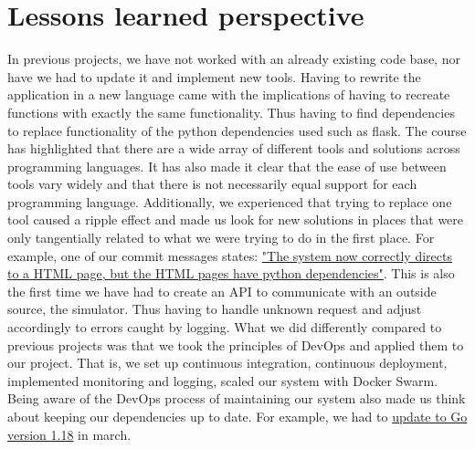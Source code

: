 \section{Lessons learned perspective}

In previous projects, we have not worked with an already existing code base, nor have we had to update it and implement new tools. Having to rewrite the application in a new language came with the implications of having to recreate functions with exactly the same functionality. Thus having to find dependencies to replace functionality of the python dependencies used such as flask.
\vspace{0.5em} \newline
The course has highlighted that there are a wide array of different tools and solutions across programming languages. It has also made it clear that the ease of use between tools vary widely and that there is not necessarily equal support for each programming language. Additionally, we experienced that trying to replace one tool caused a ripple effect and made us look for new solutions in places that were only tangentially related to what we were trying to do in the first place. For example, one of our commit messages states: \href{https://github.com/salsitu/minitwit_thesvindler/commit/b0a6703feba3e1e3453358d563e0cce79fe8b6e3}{"The system now correctly directs to a HTML page, but the HTML pages have python dependencies"}.
\vspace{0.5em} \newline
This is also the first time we have had to create an API to communicate with an outside source, the simulator. Thus having to handle unknown request and adjust accordingly to errors caught by logging.
\vspace{0.5em} \newline
What we did differently compared to previous projects was that we took the principles of DevOps and applied them to our project. That is, we set up continuous integration, continuous deployment, implemented monitoring and logging, scaled our system with Docker Swarm. Being aware of the DevOps process of maintaining our system also made us think about keeping our dependencies up to date. For example, we had to \href{https://github.com/salsitu/minitwit_thesvindler/commit/7785e42ec56e38445815946b7efa980dc9502044}{ update to Go version 1.18} in march.

